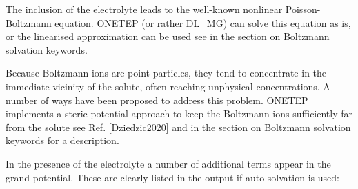 \documentclass[letterpaper,10pt,english]{sphinxmanual}
\begin{document}
The inclusion of the electrolyte leads to the well-known nonlinear
Poisson-Boltzmann equation. ONETEP (or rather DL\_MG) can solve this
equation as is, or the linearised approximation can be used \textendash{} see
 in the section on Boltzmann solvation keywords.

Because Boltzmann ions are point particles, they tend to concentrate in
the immediate vicinity of the solute, often reaching unphysical
concentrations. A number of ways have been proposed to address this
problem. ONETEP implements a steric potential approach to keep the
Boltzmann ions sufficiently far from the solute \textendash{} see Ref. {[}Dziedzic2020{]} and
 in the section on Boltzmann solvation keywords
for a description.

In the presence of the electrolyte a number of additional terms appear
in the grand potential. These are clearly listed in the output if auto
solvation is used:
\end{document}
